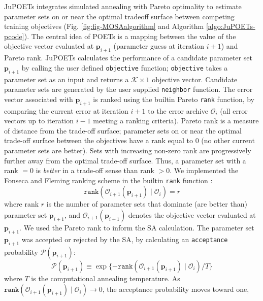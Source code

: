 \documentclass{bmcart}
\begin{document}
JuPOETs integrates simulated annealing with Pareto optimality to estimate parameter sets on or near the optimal tradeoff surface between competing training objectives
(Fig. \ref{fig:fig-MOSAalgorithm} and Algorithm \ref{algo:JuPOETs-pcode}).
The central idea of POETs is a mapping between the value of the objective vector evaluated at $\mathbf{p}_{i+1}$ (parameter guess at iteration $i+1$) and Pareto rank.
JuPOETs calculates the performance of a candidate parameter set $\mathbf{p}_{i+1}$ by calling the user defined \texttt{objective} function; \texttt{objective} takes
a parameter set as an input and returns a $\mathcal{K}\times{1}$ objective vector. Candidate parameter sets are generated by the user supplied \texttt{neighbor} function.
The error vector associated with $\mathbf{p}_{i+1}$ is ranked using the builtin Pareto \texttt{rank} function, by comparing the current error at iteration $i+1$ to the error archive $\mathcal{O}_{i}$ (all error vectors up to iteration $i-1$ meeting a ranking criteria). Pareto rank is a measure of distance from the trade-off surface;
parameter sets on or near the optimal trade-off surface between the objectives have a rank equal to $0$ (no other current parameter sets are better).
Sets with increasing non-zero rank are progressively further away from the optimal trade-off surface.
Thus, a parameter set with a rank $=0$ is \emph{better} in a trade-off sense than rank $>0$.
We implemented the Fonseca and Fleming ranking scheme in the builtin \texttt{rank} function \cite{RANKING}:
\begin{equation}\label{eqn_rank}
\texttt{rank}\left(\mathcal{O}_{i+1}\left(\mathbf{p}_{i+1}\right)\mid \mathcal{O}_{i}\right)=r
\end{equation} where rank $r$ is the number of parameter sets that dominate (are better than) parameter set $\mathbf{p}_{i+1}$, and $\mathcal{O}_{i+1}\left(\mathbf{p}_{i+1}\right)$
denotes the objective vector evaluated at $\mathbf{p}_{i+1}$.
We used the Pareto rank to inform the SA calculation.
The parameter set $\mathbf{p}_{i+1}$ was accepted or rejected by the SA, by calculating an \texttt{acceptance} probability $\mathcal{P}\left(\mathbf{p}_{i+1}\right)$:
\begin{equation}\label{eqn_costMOSA}
\mathcal{P}(\mathbf{p}_{i+1}) \equiv \exp{\{-\texttt{rank}\left(\mathcal{O}_{i+1}\left(\mathbf{p}_{i+1}\right) \mid \mathcal{O}_{i} \right)/T\}}
\end{equation}
where $T$ is the computational annealing temperature.
As $\texttt{rank}\left(\mathcal{O}_{i+1}\left(\mathbf{p}_{i+1}\right)\mid \mathcal{O}_{i}\right)\rightarrow{0}$, the acceptance probability moves toward one,
\end{document}
